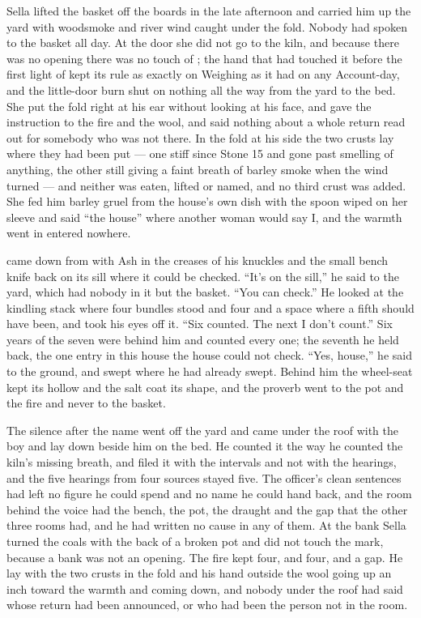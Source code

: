 Sella lifted the basket off the boards in the late afternoon and carried him up the yard with woodsmoke and river wind caught under the fold. Nobody had spoken to the basket all day. At the door she did not go to the kiln, and because there was no opening there was no touch of ; the hand that had touched it before the first light of  kept its rule as exactly on Weighing as it had on any Account-day, and the little-door burn shut on nothing all the way from the yard to the bed. She put the fold right at his ear without looking at his face, and gave the instruction to the fire and the wool, and said nothing about a whole return read out for somebody who was not there. In the fold at his side the two crusts lay where they had been put --- one stiff since Stone 15 and gone past smelling of anything, the other still giving a faint breath of barley smoke when the wind turned --- and neither was eaten, lifted or named, and no third crust was added. She fed him barley gruel from the house's own dish with the spoon wiped on her sleeve and said “the house” where another woman would say I, and the warmth went in entered nowhere.

 came down from  with Ash in the creases of his knuckles and the small bench knife back on its sill where it could be checked. “It's on the sill,” he said to the yard, which had nobody in it but the basket. “You can check.” He looked at the kindling stack where four bundles stood and four and a space where a fifth should have been, and took his eyes off it. “Six counted. The next I don't count.” Six years of the seven were behind him and counted every one; the seventh he held back, the one entry in this house the house could not check. “Yes, house,” he said to the ground, and swept where he had already swept. Behind him the wheel-seat kept its hollow and the salt coat its shape, and the proverb went to the pot and the fire and never to the basket.

The silence after the name went off the yard and came under the roof with the boy and lay down beside him on the bed. He counted it the way he counted the kiln's missing breath, and filed it with the intervals and not with the hearings, and the five hearings from four sources stayed five. The officer's clean sentences had left no figure he could spend and no name he could hand back, and the room behind the voice had the bench, the pot, the draught and the gap that the other three rooms had, and he had written no cause in any of them. At the bank Sella turned the coals with the back of a broken pot and did not touch the mark, because a bank was not an opening. The fire kept four, and four, and a gap. He lay with the two crusts in the fold and his hand outside the wool going up an inch toward the warmth and coming down, and nobody under the roof had said whose return had been announced, or who had been the person not in the room.
